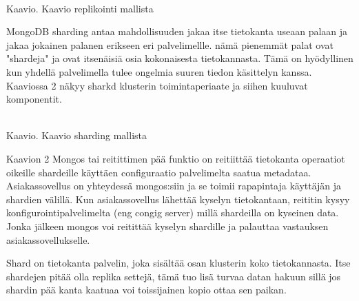 \\
Kaavio\getChartCount{}. Kaavio replikointi mallista 
\medskip




MongoDB sharding antaa mahdollisuuden jakaa itse tietokanta useaan palaan ja jakaa jokainen palanen erikseen eri palvelimellle.
nämä pienemmät palat ovat "shardeja"{} ja ovat itsenäisiä osia kokonaisesta tietokannasta.
%
Tämä on hyödyllinen kun yhdellä palvelimella tulee ongelmia suuren tiedon käsittelyn kanssa.
Kaaviossa 2 näkyy sharkd klusterin toimintaperiaate ja siihen kuuluvat komponentit. 
\medskip
\bigskip




\\
Kaavio\getChartCount{}. Kaavio sharding mallista 
\medskip

Kaavion 2 Mongos tai reitittimen pää funktio on reitiittää tietokanta operaatiot oikeille shardeille käyttäen configuraatio palvelimelta saatua metadataa.
Asiakassovellus on yhteydessä mongos:siin ja se toimii rapapintaja käyttäjän ja shardien välillä. 
Kun asiakassovellus lähettää kyselyn tietokantaan, reititin kysyy konfigurointipalvelimelta (eng congig server) millä shardeilla on kyseinen data. 
Jonka jälkeen mongos voi reitittää kyselyn shardille ja palauttaa vastauksen asiakassovellukselle.
\medskip

Shard on tietokanta palvelin, joka sisältää osan klusterin koko tietokannasta.
Itse shardejen pitää olla replika settejä, 
tämä tuo lisä turvaa datan hakuun sillä jos shardin pää kanta kaatuaa voi toissijainen kopio ottaa sen paikan. 
\medskip


